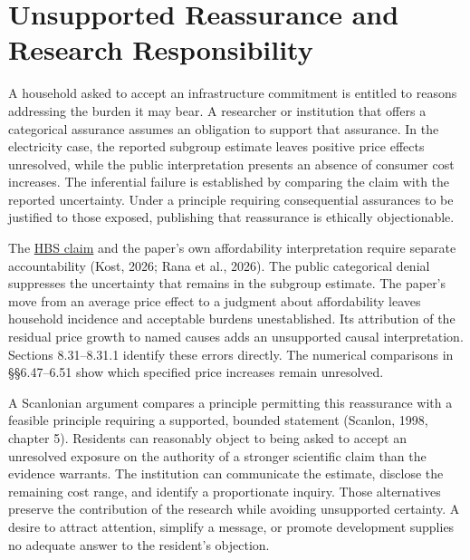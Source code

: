
\hypertarget{M09-unsupported-reassurance-and-research-responsibility}{%
\section{Unsupported Reassurance and Research
Responsibility}\label{M09-unsupported-reassurance-and-research-responsibility}}

\noindent \noindent A household asked to accept an infrastructure commitment is
entitled to reasons addressing the burden it may bear. A researcher or
institution that offers a categorical assurance assumes an obligation to
support that assurance. In the electricity case, the reported subgroup
estimate leaves positive price effects unresolved, while the public
interpretation presents an absence of consumer cost increases. The
inferential failure is established by comparing the claim with the
reported uncertainty. Under a principle requiring consequential
assurances to be justified to those exposed, publishing that reassurance
is ethically objectionable.

The
\href{https://www.library.hbs.edu/working-knowledge/blaming-data-centers-for-higher-electric-bills-its-not-that-simple}{HBS
claim} and the paper's own affordability interpretation require separate
accountability (Kost, 2026; Rana et al., 2026). The public categorical
denial suppresses the uncertainty that remains in the subgroup estimate.
The paper's move from an average price effect to a judgment about
affordability leaves household incidence and acceptable burdens
unestablished. Its attribution of the residual price growth to named
causes adds an unsupported causal interpretation. Sections 8.31--8.31.1
identify these errors directly. The numerical comparisons in
§§6.47--6.51 show which specified price increases remain unresolved.

A Scanlonian argument compares a principle permitting this reassurance
with a feasible principle requiring a supported, bounded statement
(Scanlon, 1998, chapter 5). Residents can reasonably object to being
asked to accept an unresolved exposure on the authority of a stronger
scientific claim than the evidence warrants. The institution can
communicate the estimate, disclose the remaining cost range, and
identify a proportionate inquiry. Those alternatives preserve the
contribution of the research while avoiding unsupported certainty. A
desire to attract attention, simplify a message, or promote development
supplies no adequate answer to the resident's objection.

